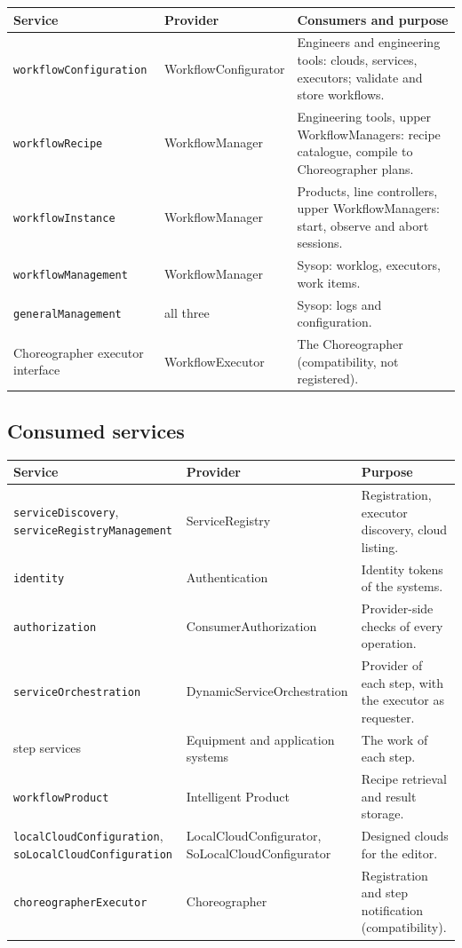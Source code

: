 \documentclass[a4paper]{arrowhead}
\begin{document}
{\small
\begin{longtable}{|p{4.6cm}|p{3.6cm}|p{7.6cm}|}

\hline
\rowcolor{gray!33} Service & Provider & Consumers and purpose \\ \hline
\endhead
\texttt{workflowConfiguration} & WorkflowConfigurator & Engineers and engineering tools: clouds, services, executors; validate and store workflows. \\ \hline
\texttt{workflowRecipe} & WorkflowManager & Engineering tools, upper WorkflowManagers: recipe catalogue, compile to Choreographer plans. \\ \hline
\texttt{workflowInstance} & WorkflowManager & Products, line controllers, upper WorkflowManagers: start, observe and abort sessions. \\ \hline
\texttt{workflowManagement} & WorkflowManager & Sysop: worklog, executors, work items. \\ \hline
\texttt{generalManagement} & all three & Sysop: logs and configuration. \\ \hline
Choreographer executor interface & WorkflowExecutor & The Choreographer (compatibility, not registered). \\ \hline
\end{longtable}
}


\subsection{Consumed services}

{\small
\begin{longtable}{|p{5.6cm}|p{4.2cm}|p{6.0cm}|}

\hline
\rowcolor{gray!33} Service & Provider & Purpose \\ \hline
\endhead
\texttt{serviceDiscovery}, \texttt{serviceRegistryManagement} & ServiceRegistry & Registration, executor discovery, cloud listing. \\ \hline
\texttt{identity} & Authentication & Identity tokens of the systems. \\ \hline
\texttt{authorization} & ConsumerAuthorization & Provider-side checks of every operation. \\ \hline
\texttt{serviceOrchestration} & DynamicServiceOrchestration & Provider of each step, with the executor as requester. \\ \hline
step services & Equipment and application systems & The work of each step. \\ \hline
\texttt{workflowProduct} & Intelligent Product & Recipe retrieval and result storage. \\ \hline
\texttt{localCloudConfiguration}, \texttt{soLocalCloudConfiguration} & LocalCloudConfigurator, SoLocalCloudConfigurator & Designed clouds for the editor. \\ \hline
\texttt{choreographerExecutor} & Choreographer & Registration and step notification (compatibility). \\ \hline
\end{longtable}
}
\end{document}
